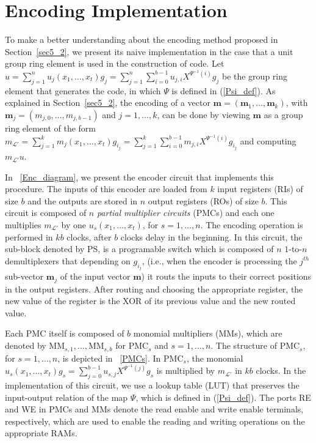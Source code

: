 \documentclass[journal,draftclsnofoot,onecolumn,12pt,twoside]{IEEEtran}
\begin{document}
\section{Encoding Implementation}\label{implementation}
To make a better understanding about the  encoding method proposed in Section~\ref{sec5_2}, we present its naive implementation  in the case that a unit group ring element is used in the construction of code. Let $u=\sum_{j=1}^nu_j(x_1,\ldots,x_t)g_j=\sum_{j=1}^{n}\sum_{i=0}^{b-1}u_{j,i}X^{\Psi^{-1}(i)}g_j$ be the group ring element that generates the code, in which $\Psi$ is defined in (\ref{Psi_def}).
As explained in Section~\ref{sec5_2}, the encoding of a vector $\mathbf{m}=(\mathbf{m}_{1},\ldots,\mathbf{m}_k)$, with $\mathbf{m}_j=(m_{j,0},\ldots,m_{j,b-1})$ and $j=1,\ldots,k$, can be done by viewing  $\mathbf{m}$ as a group ring element of the form $m_{\mathcal{L}'}=\sum_{j=1}^km_j(x_1,\ldots,x_t)g_{i_j}=\sum_{j=1}^k\sum_{i=0}^{b-1}m_{j,i}X^{\Psi^{-1}(i)}g_{i_j}$ and computing $m_{\mathcal{L}'}u$.


In \figurename~\ref{Enc_diagram}, we present the encoder circuit that implements this procedure. The inputs of this encoder are loaded from $k$ input registers  (RIs) of size $b$ and the outputs are stored in $n$ output registers (ROs) of size $b$. This circuit is composed of $n$ \emph{partial multiplier circuits} (PMCs) and each one multiplies $m_{\mathcal{L}'}$ by one $u_s(x_1,\ldots,x_t)$, for $s=1,\ldots,n$. The encoding operation is performed in $kb$ clocks, after $b$ clocks delay in the beginning. In this circuit, the sub-block  denoted by PS, is a programable switch which is composed of $n$ $1$-to-$n$ demultiplexers that depending on $g_{i_j}$, (i.e., when the encoder is processing the $j^{th}$ sub-vector $\mathbf{m}_j$ of the input vector $\mathbf{m}$) it routs the inputs to their correct positions in the output registers. After routing and choosing the appropriate register, the new value of the register is the XOR of its previous value and the new routed value.


Each PMC itself is composed  of $b$ monomial multipliers (MMs), which are denoted by $\textrm{MM}_{s,1},\ldots,\textrm{MM}_{s,b}$ for $\textrm{PMC}_s$ and $s=1,\ldots,n$. The structure of $\textrm{PMC}_s$, for $s=1,\ldots,n$, is depicted in \figurename~\ref{PMCs}. In $\textrm{PMC}_s$, the monomial $u_s(x_1,\ldots,x_t)g_s=\sum_{j=0}^{b-1}u_{s,j}X^{\Psi^{-1}(j)}g_s$ is multiplied by $m_{\mathcal{L}'}$ in $kb$ clocks. In the implementation of this circuit, we use a lookup table (LUT) that preserves the input-output relation of the map $\Psi$, which is defined in (\ref{Psi_def}). The ports RE and WE in PMCs and MMs denote the read enable and write enable terminals, respectively, which are used to enable  the reading and writing operations on the appropriate RAMs.
\end{document}
